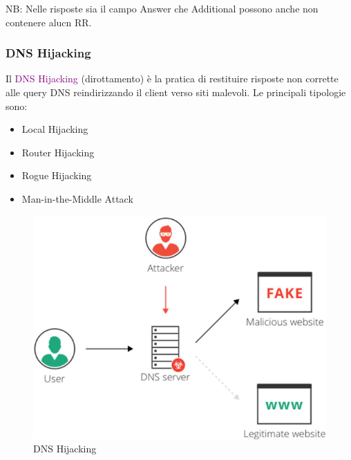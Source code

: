 NB: Nelle risposte sia il campo Answer che Additional possono anche non contenere alucn RR.

\subsubsection{DNS Hijacking}
Il \textcolor{purple}{DNS Hijacking} (dirottamento) è la pratica di restituire risposte non corrette alle query DNS reindirizzando il client verso siti malevoli.
Le principali tipologie sono:
\begin{itemize}
    \item Local Hijacking
    \item Router Hijacking
    \item Rogue Hijacking
    \item Man-in-the-Middle Attack
\end{itemize}
\begin{figure}[h]
    \centering
    \includegraphics[scale=0.35]{Immagini/DNS_Hijacking.png}
    \caption{DNS Hijacking}
\end{figure}

